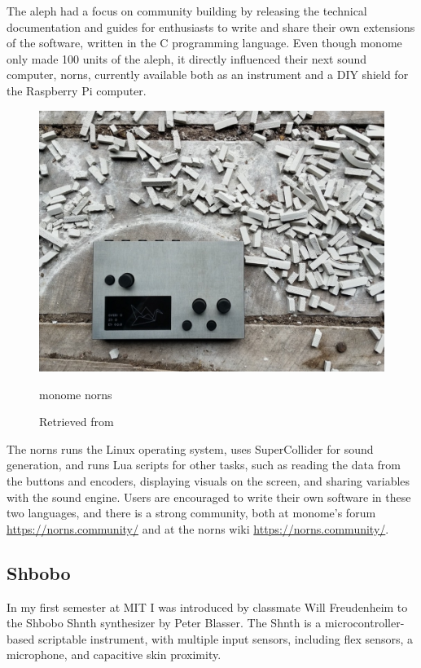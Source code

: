 The aleph had a focus on community building by releasing the technical documentation and guides for enthusiasts to write and share their own extensions of the software, written in the C programming language. Even though monome only made 100 units of the aleph, it directly influenced their next sound computer, norns, currently available both as an instrument and a \acrshort{DIY} shield for the Raspberry Pi computer.

\begin{figure}[ht]
  \centering
  \includegraphics[width=0.75\linewidth,height=0.25\textheight,keepaspectratio]{images/monome-norns.jpg}
  \caption{monome norns}
  \caption*{Retrieved from \cite{website-monome-current}}
  \label{fig:monome-norns}
\end{figure}

The norns runs the Linux operating system, uses SuperCollider for sound generation, and runs Lua scripts for other tasks, such as reading the data from the buttons and encoders, displaying visuals on the screen, and sharing variables with the sound engine. Users are encouraged to write their own software in these two languages, and there is a strong community, both at monome's forum \url{https://norns.community/} and at the norns wiki \url{https://norns.community/}.

\subsection{Shbobo}

In my first semester at MIT I was introduced by classmate Will Freudenheim to the Shbobo Shnth synthesizer by Peter Blasser. The Shnth is a microcontroller-based scriptable instrument, with multiple input sensors, including flex sensors,  a microphone, and capacitive skin proximity.

